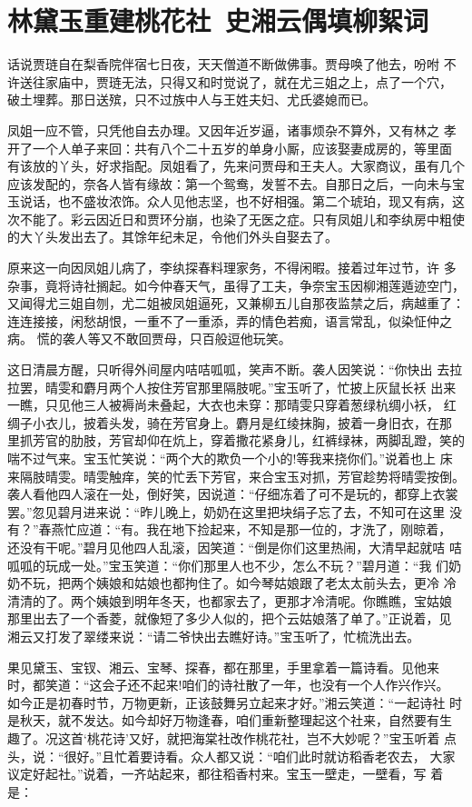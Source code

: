 \chapter{林黛玉重建桃花社~史湘云偶填柳絮词}

话说贾琏自在梨香院伴宿七日夜，天天僧道不断做佛事。贾母唤了他去，吩咐
不许送往家庙中，贾琏无法，只得又和时觉说了，就在尤三姐之上，点了一个穴，
破土埋葬。那日送殡，只不过族中人与王姓夫妇、尤氏婆媳而已。

凤姐一应不管，只凭他自去办理。又因年近岁逼，诸事烦杂不算外，又有林之
孝开了一个人单子来回：共有八个二十五岁的单身小厮，应该娶妻成房的，等里面
有该放的丫头，好求指配。凤姐看了，先来问贾母和王夫人。大家商议，虽有几个
应该发配的，奈各人皆有缘故：第一个鸳鸯，发誓不去。自那日之后，一向未与宝
玉说话，也不盛妆浓饰。众人见他志坚，也不好相强。第二个琥珀，现又有病，这
次不能了。彩云因近日和贾环分崩，也染了无医之症。只有凤姐儿和李纨房中粗使
的大丫头发出去了。其馀年纪未足，令他们外头自娶去了。

原来这一向因凤姐儿病了，李纨探春料理家务，不得闲暇。接着过年过节，许
多杂事，竟将诗社搁起。如今仲春天气，虽得了工夫，争奈宝玉因柳湘莲遁迹空门，
又闻得尤三姐自刎，尤二姐被凤姐逼死，又兼柳五儿自那夜监禁之后，病越重了：
连连接接，闲愁胡恨，一重不了一重添，弄的情色若痴，语言常乱，似染怔仲之病。
慌的袭人等又不敢回贾母，只百般逗他玩笑。

这日清晨方醒，只听得外间屋内咭咭呱呱，笑声不断。袭人因笑说：“你快出
去拉拉罢，晴雯和麝月两个人按住芳官那里隔肢呢。”宝玉听了，忙披上灰鼠长袄
出来一瞧，只见他三人被褥尚未叠起，大衣也未穿：那晴雯只穿着葱绿杭绸小袄，
红绸子小衣儿，披着头发，骑在芳官身上。麝月是红绫抹胸，披着一身旧衣，在那
里抓芳官的肋肢，芳官却仰在炕上，穿着撒花紧身儿，红裤绿袜，两脚乱蹬，笑的
喘不过气来。宝玉忙笑说：“两个大的欺负一个小的!等我来挠你们。”说着也上
床来隔肢晴雯。晴雯触痒，笑的忙丢下芳官，来合宝玉对抓，芳官趁势将晴雯按倒。
袭人看他四人滚在一处，倒好笑，因说道：“仔细冻着了可不是玩的，都穿上衣裳
罢。”忽见碧月进来说：“昨儿晚上，奶奶在这里把块绢子忘了去，不知可在这里
没有？”春燕忙应道：“有。我在地下捡起来，不知是那一位的，才洗了，刚晾着，
还没有干呢。”碧月见他四人乱滚，因笑道：“倒是你们这里热闹，大清早起就咭
咭呱呱的玩成一处。”宝玉笑道：“你们那里人也不少，怎么不玩？”碧月道：“我
们奶奶不玩，把两个姨娘和姑娘也都拘住了。如今琴姑娘跟了老太太前头去，更冷
冷清清的了。两个姨娘到明年冬天，也都家去了，更那才冷清呢。你瞧瞧，宝姑娘
那里出去了一个香菱，就像短了多少人似的，把个云姑娘落了单了。”正说着，见
湘云又打发了翠缕来说：“请二爷快出去瞧好诗。”宝玉听了，忙梳洗出去。

果见黛玉、宝钗、湘云、宝琴、探春，都在那里，手里拿着一篇诗看。见他来
时，都笑道：“这会子还不起来!咱们的诗社散了一年，也没有一个人作兴作兴。
如今正是初春时节，万物更新，正该鼓舞另立起来才好。”湘云笑道：“一起诗社
时是秋天，就不发达。如今却好万物逢春，咱们重新整理起这个社来，自然要有生
趣了。况这首‘桃花诗’又好，就把海棠社改作桃花社，岂不大妙呢？”宝玉听着
点头，说：“很好。”且忙着要诗看。众人都又说：“咱们此时就访稻香老农去，
大家议定好起社。”说着，一齐站起来，都往稻香村来。宝玉一壁走，一壁看，写
着是：


